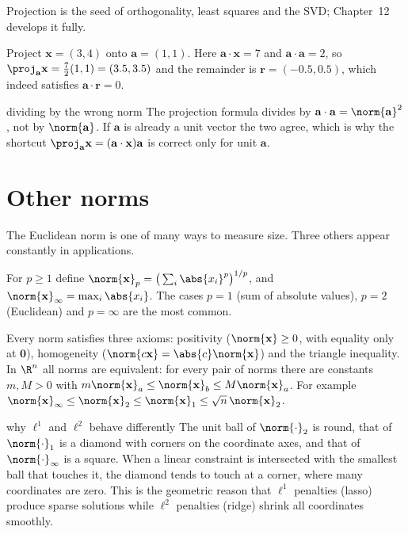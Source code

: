Projection is the seed of orthogonality, least squares and the SVD; Chapter~12 develops it fully.

\begin{example}
Project $\mathbf{x}=(3,4)$ onto $\mathbf{a}=(1,1)$. Here $\mathbf{a}\cdot\mathbf{x}=7$ and $\mathbf{a}\cdot\mathbf{a}=2$, so $\proj_{\mathbf{a}}\mathbf{x}=\frac72(1,1)=(3.5,3.5)$ and the remainder is $\mathbf{r}=(-0.5,0.5)$, which indeed satisfies $\mathbf{a}\cdot\mathbf{r}=0$.
\end{example}

\begin{pitfall}{dividing by the wrong norm}
The projection formula divides by $\mathbf{a}\cdot\mathbf{a}=\norm{\mathbf{a}}^2$, not by $\norm{\mathbf{a}}$. If $\mathbf{a}$ is already a unit vector the two agree, which is why the shortcut $\proj_{\mathbf{a}}\mathbf{x}=(\mathbf{a}\cdot\mathbf{x})\mathbf{a}$ is correct only for unit $\mathbf{a}$.
\end{pitfall}

\section{Other norms}

The Euclidean norm is one of many ways to measure size. Three others appear constantly in applications.

\begin{definition}[$p$-norms]
For $p\ge1$ define $\norm{\mathbf{x}}_p=\big(\sum_i\abs{x_i}^p\big)^{1/p}$, and $\norm{\mathbf{x}}_\infty=\max_i\abs{x_i}$. The cases $p=1$ (sum of absolute values), $p=2$ (Euclidean) and $p=\infty$ are the most common.
\end{definition}

Every norm satisfies three axioms: positivity ($\norm{\mathbf{x}}\ge0$, with equality only at $\mathbf{0}$), homogeneity ($\norm{c\mathbf{x}}=\abs{c}\norm{\mathbf{x}}$) and the triangle inequality. In $\R^n$ all norms are equivalent: for every pair of norms there are constants $m,M>0$ with $m\norm{\mathbf{x}}_a\le\norm{\mathbf{x}}_b\le M\norm{\mathbf{x}}_a$. For example $\norm{\mathbf{x}}_\infty\le\norm{\mathbf{x}}_2\le\norm{\mathbf{x}}_1\le\sqrt n\,\norm{\mathbf{x}}_2$.

\begin{interview}{why $\ell^1$ and $\ell^2$ behave differently}
The unit ball of $\norm{\cdot}_2$ is round, that of $\norm{\cdot}_1$ is a diamond with corners on the coordinate axes, and that of $\norm{\cdot}_\infty$ is a square. When a linear constraint is intersected with the smallest ball that touches it, the diamond tends to touch at a corner, where many coordinates are zero. This is the geometric reason that $\ell^1$ penalties (lasso) produce sparse solutions while $\ell^2$ penalties (ridge) shrink all coordinates smoothly.
\end{interview}

